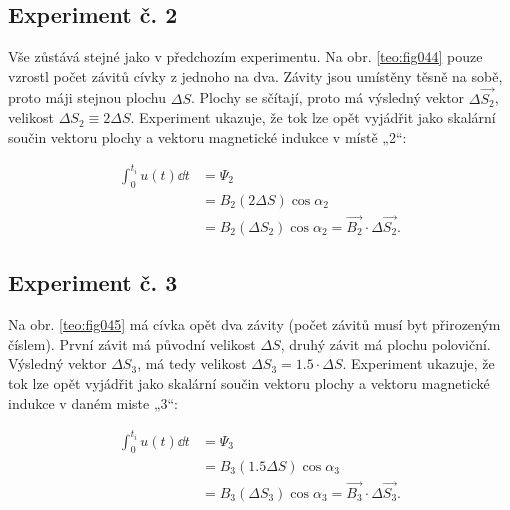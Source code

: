       \subsection{Experiment č. 2}
        Vše zůstává stejné jako v předchozím experimentu. Na obr. \ref{teo:fig044} pouze vzrostl
        počet závitů cívky z jednoho na dva. Závity jsou umístěny těsně na sobě, proto máji stejnou
        plochu \(\Delta S\). Plochy se sčítají, proto má výsledný vektor \(\Delta \vec{S_2}\),
        velikost \(\Delta S_2\equiv2\Delta S\). Experiment ukazuje, že tok lze opět vyjádřit jako
        skalární součin vektoru plochy a vektoru magnetické indukce v místě „2“:

        
        \begin{align}
          \int_0^{t_i} u(t)\dd{t} 
             &= \Psi_2                                               \nonumber \\                
             &= B_2(2\Delta S)\cos\alpha_2                           \nonumber \\
             &= B_2(\Delta S_2)\cos\alpha_2 
              = \vec{B_2}\cdot\Delta\vec{S_2}.                       \label{TEO:eq080}
        \end{align}

      \subsection{Experiment č. 3}
        Na obr. \ref{teo:fig045} má cívka opět dva závity (počet závitů musí byt 
        přirozeným číslem). První závit má původní velikost \(\Delta S\), druhý závit má plochu 
        poloviční. Výsledný vektor \(\Delta S_3\), má tedy velikost \(\Delta S_3 = 
        \num{1.5}\cdot\Delta S\). Experiment ukazuje, že tok lze opět vyjádřit jako skalární součin 
        vektoru plochy a vektoru magnetické indukce v daném miste „3“:


        \begin{align}
          \int_0^{t_i} u(t)\dd{t} 
            &= \Psi_3                                              \nonumber  \\
            &= B_3(\num{1.5}\Delta S)\cos\alpha_3                  \nonumber  \\
            &= B_3(\Delta S_3)\cos\alpha_3 
             = \vec{B_3}\cdot\Delta\vec{S_3}.                      \label{TEO:eq081}
        \end{align}
         
